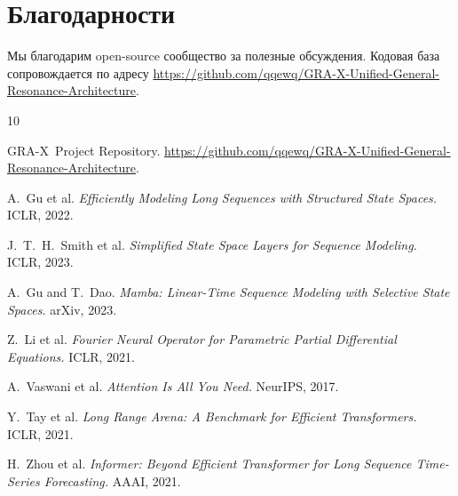 \documentclass{article}
\newcommand{\GRA}{\textsc{GRA-X}}
\begin{document}
\section*{Благодарности}
Мы благодарим open-source сообщество за полезные обсуждения. Кодовая база сопровождается по адресу \url{https://github.com/qqewq/GRA-X-Unified-General-Resonance-Architecture}.


\begin{thebibliography}{10}

\GRA\ Project Repository.
\url{https://github.com/qqewq/GRA-X-Unified-General-Resonance-Architecture}.

A.~Gu et al.
\emph{Efficiently Modeling Long Sequences with Structured State Spaces.}
ICLR, 2022.

J.~T.~H.~Smith et al.
\emph{Simplified State Space Layers for Sequence Modeling.}
ICLR, 2023.

A.~Gu and T.~Dao.
\emph{Mamba: Linear-Time Sequence Modeling with Selective State Spaces.}
arXiv, 2023.

Z.~Li et al.
\emph{Fourier Neural Operator for Parametric Partial Differential Equations.}
ICLR, 2021.

A.~Vaswani et al.
\emph{Attention Is All You Need.}
NeurIPS, 2017.

Y.~Tay et al.
\emph{Long Range Arena: A Benchmark for Efficient Transformers.}
ICLR, 2021.

H.~Zhou et al.
\emph{Informer: Beyond Efficient Transformer for Long Sequence Time-Series Forecasting.}
AAAI, 2021.

\end{thebibliography}
\end{document}
